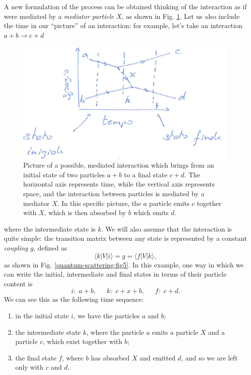 A new formulation of the process can be obtained thinking of the interaction as if were mediated by a \emph{mediator particle} $X$, as shown in Fig. \ref{quantum-scattering:fig4}. Let us also include the time in our ``picture'' of an interaction: for example, let's take an interaction $a+b\rightarrow c+d$
\begin{figure}
    \centering
    \includegraphics[scale=0.5]{Figures/qscat2.pdf}
    \caption{Picture of a possible, mediated interaction which brings from an initial state of two particles $a+b$ to a final state $c+d$. The horizontal axis represents time, while the vertical axis represents space, and the interaction between particles is mediated by a mediator $X$. In this specific picture, the $a$ particle emits $c$ together with $X$, which is then absorbed by $b$ which emits $d$.}
    \label{quantum-scattering:fig4}
\end{figure}
where the intermediate state is $k$. We will also assume that the interaction is quite simple: the transition matrix between any state is represented by a constant \emph{coupling} $g$, defined as
\[\langle k |V|i\rangle = g=\langle f |V|k\rangle,\]
as shown in Fig. \ref{quantum-scattering:fig5}. In this example, one way in which we can write the initial, intermediate and final states in terms of their particle content is
\begin{equation*}
    i:\,\,a+b,  \,\,\,\,\,\,\,\,\, k:\,\,c+x+b,\,\,\,\,\,\,\,\,\, f:\,\,c+d.
\end{equation*}
We can see this as the following time sequence:
\begin{enumerate}
    \item in the initial state $i$, we have the particles $a$ and $b$;
    \item the intermediate state $k$, where the particle $a$ emits a particle $X$ and a particle $c$, which exist together with $b$;
    \item the final state $f$, where $b$ has absorbed $X$ and emitted $d$, and so we are left only with $c$ and $d$.
\end{enumerate}
    
